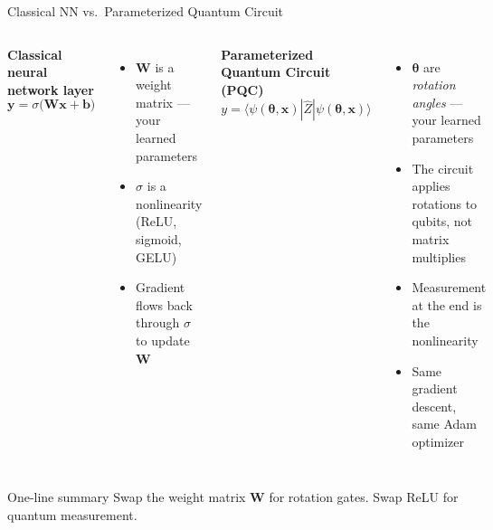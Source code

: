 \documentclass[aspectratio=169,professionalfonts]{beamer}
\begin{document}
\begin{frame}{Classical NN vs.\ Parameterized Quantum Circuit}
\begin{columns}[T]
\textbf{Classical neural network layer}
\[
  \mathbf{y} = \sigma\!\bigl(\mathbf{W}\mathbf{x} + \mathbf{b}\bigr)
\]
\begin{itemize}
  \item $\mathbf{W}$ is a weight matrix --- your learned parameters
  \item $\sigma$ is a nonlinearity (ReLU, sigmoid, GELU)
  \item Gradient flows back through $\sigma$ to update $\mathbf{W}$
\end{itemize}

\textbf{Parameterized Quantum Circuit (PQC)}
\[
  y = \langle\psi(\boldsymbol{\theta}, \mathbf{x})| \hat{Z} |\psi(\boldsymbol{\theta}, \mathbf{x})\rangle
\]
\begin{itemize}
  \item $\boldsymbol{\theta}$ are \emph{rotation angles} --- your learned parameters
  \item The circuit applies rotations to qubits, not matrix multiplies
  \item Measurement at the end is the nonlinearity
  \item Same gradient descent, same Adam optimizer
\end{itemize}
\end{columns}

\vspace{0.6em}
\begin{block}{One-line summary}
Swap the weight matrix $\mathbf{W}$ for rotation gates. Swap ReLU for quantum measurement.
\end{block}
\end{frame}
\end{document}
